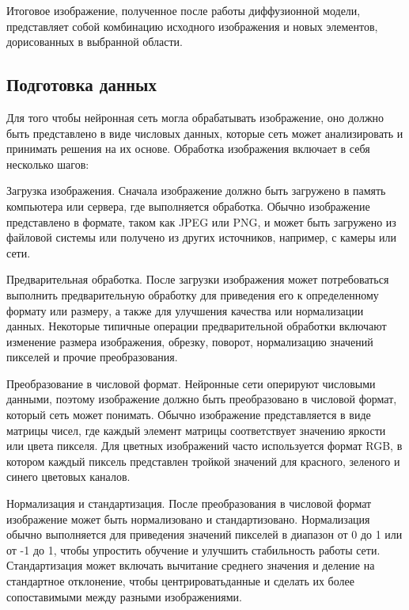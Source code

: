 Итоговое изображение, полученное после работы диффузионной 
модели, представляет собой комбинацию исходного изображения и новых 
элементов, дорисованных в выбранной области.

\subsection{Подготовка данных}

Для того чтобы нейронная сеть могла обрабатывать изображение, оно 
должно быть представлено в виде числовых данных, которые сеть может 
анализировать и принимать решения на их основе. Обработка изображения 
включает в себя несколько шагов:

\begin{enumerate_step}
    \item Загрузка изображения. Сначала изображение должно быть загружено в память компьютера или сервера, где выполняется обработка. Обычно изображение представлено в формате, таком как JPEG или PNG, и может быть загружено из файловой системы или получено из других источников, например, с камеры или сети.
    \item Предварительная обработка. После загрузки изображения может потребоваться выполнить предварительную обработку для приведения его к определенному формату или размеру, а также для улучшения качества или нормализации данных. Некоторые типичные операции предварительной обработки включают изменение размера изображения, обрезку, поворот, нормализацию значений пикселей и прочие преобразования.
    \item Преобразование в числовой формат. Нейронные сети оперируют числовыми данными, поэтому изображение должно быть преобразовано в числовой формат, который сеть может понимать. Обычно изображение представляется в виде матрицы чисел, где каждый элемент матрицы соответствует значению яркости или цвета пикселя. Для цветных изображений часто используется формат RGB, в котором каждый пиксель представлен тройкой значений для красного, зеленого и синего цветовых каналов.
    \item Нормализация и стандартизация. После преобразования в числовой формат изображение может быть нормализовано и стандартизовано. Нормализация обычно выполняется для приведения значений пикселей в диапазон от 0 до 1 или от -1 до 1, чтобы упростить обучение и улучшить стабильность работы сети. Стандартизация может включать вычитание среднего значения и деление на стандартное отклонение, чтобы центрироватьданные и сделать их более сопоставимыми между разными изображениями.

\end{enumerate_step}
